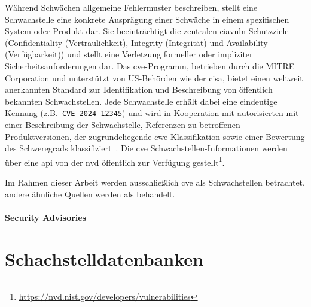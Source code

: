 Während Schwächen allgemeine Fehlermuster beschreiben, stellt eine Schwachstelle eine konkrete Ausprägung einer Schwäche in einem spezifischen System oder Produkt dar.
Sie beeinträchtigt die zentralen \acrshort{ciavuln}-Schutzziele (Confidentiality (Vertraulichkeit), Integrity (Integrität) und Availability (Verfügbarkeit)) und stellt eine Verletzung formeller oder impliziter Sicherheitsanforderungen dar.
Das \acrshort{cve}-Programm, betrieben durch die MITRE Corporation und unterstützt von US-Behörden wie der \acrfull{cisa}, bietet einen weltweit anerkannten Standard zur Identifikation und Beschreibung von öffentlich bekannten Schwachstellen.
Jede Schwachstelle erhält dabei eine eindeutige Kennung (z.B.\ \verb+CVE-2024-12345+) und wird in Kooperation mit autorisierten  mit einer Beschreibung der Schwachstelle, Referenzen zu betroffenen Produktversionen, der zugrundeliegende \acrshort{cwe}-Klassifikation sowie einer Bewertung des Schweregrads klassifiziert\ \autocite{Ross_Winstead_McEvilley_2022, CveGlossaryCommonVulnerabilitiesAndExposures12mai2025}.
Die \acrshort{cve} Schwachstellen-Informationen werden über eine \acrshort{api} von der \acrshort{nvd} öffentlich zur Verfügung gestellt\footnote{\url{https://nvd.nist.gov/developers/vulnerabilities}}.

Im Rahmen dieser Arbeit werden ausschließlich \acrshort{cve} als Schwachstellen betrachtet, andere ähnliche Quellen werden als  behandelt.

\paragraph{Security Advisories}\label{par:security-advisories}



\section{Schachstelldatenbanken}\label{sec:security-vulnerability-databases}



